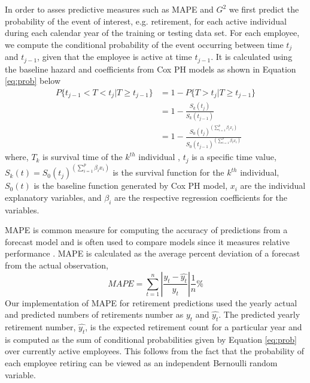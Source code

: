 \documentclass[12pt,letterpaper]{article}
\begin{document}
In order to asses predictive measures such as MAPE and $G^2$ we first predict the probability of the event of interest, e.g. retirement, for each active individual during each calendar year of the training or testing data set.  For each employee, we compute the conditional probability of the event occurring between time $t_j$ and $t_{j-1}$, given that the employee is active at time $t_{j-1}$. It is calculated using the baseline hazard and coefficients from Cox PH models as shown in Equation \ref{eq:prob} below
\begin{equation}
\label{eq:prob}
\begin{split}%
P\{t_{j-1}<T<t_j|T \ge t_{j-1}\} &=1-P\{T>t_j|T \ge t_{j-1}\}\\
&=1-\frac{S_k(t_j)}{S_k{(t_{j-1})}}   \\
&=1-\frac{{S_0(t_j)}^{(\sum_{i=1}^{p}\beta_ix_i)}}{   {S_0(t_{j-1})}^{(\sum_{i=1}^{p}\beta_ix_i)}}
\end{split}
\end{equation}
where, $T_k$ is survival time of the $k^{th}$ individual , $t_j$ is a specific time value, $S_k(t) = {S_0(t_j)}^{(\sum_{i=1}^{p}\beta_ix_i)}$ is the survival function for the $k^{th}$ individual, $S_0(t)$ is the baseline function generated by Cox PH model, $x_i$ are the individual explanatory variables, and $\beta_i$ are the respective regression coefficients for the variables.

MAPE is common measure for computing the accuracy of predictions from a forecast model and is often used to compare models since it measures relative performance \citep{chu1998}. MAPE is calculated as the average percent deviation of a forecast from the actual observation,
\begin{equation}
\label{eq:mape}
MAPE=\sum_{t=1}^{n}\left | \frac{y_t-\hat{y_t}}{y_t} \right |\frac{1}{n}\%
\end{equation}
Our implementation of MAPE for retirement predictions used the yearly actual and predicted numbers of retirements number as $y_t$ and $\hat{y_t}$. The predicted yearly retirement number, $\hat{y_t}$,  is the expected retirement count for a particular year and is computed as the sum of conditional probabilities given by Equation \ref{eq:prob} over currently active employees.  This follows from the fact that the probability of each employee retiring can be viewed as an independent Bernoulli random variable.
\end{document}
